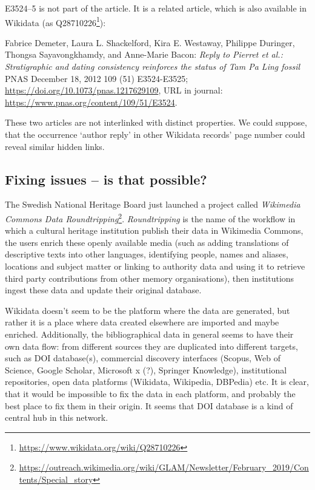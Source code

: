 E3524–5 is not part of the article. It is a related article, which is also available in Wikidata (as Q28710226\footnote{\url{https://www.wikidata.org/wiki/Q28710226}}):

Fabrice Demeter, Laura L. Shackelford, Kira E. Westaway, Philippe Duringer, Thongsa Sayavongkhamdy, and Anne-Marie Bacon: \emph{Reply to Pierret et al.: Stratigraphic and dating consistency reinforces the status of Tam Pa Ling fossil} PNAS December 18, 2012 109 (51) E3524-E3525; \url{https://doi.org/10.1073/pnas.1217629109}, URL in journal: \url{https://www.pnas.org/content/109/51/E3524}.

These two articles are not interlinked with distinct properties. We could suppose, that the occurrence `author reply' in other Wikidata records' page number could reveal similar hidden links.

\subsection{Fixing issues -- is that possible?}

The Swedish National Heritage Board just launched a project called \emph{Wikimedia Commons Data Roundtripping}\footnote{\url{https://outreach.wikimedia.org/wiki/GLAM/Newsletter/February_2019/Contents/Special_story}}. \emph{Roundtripping} is the name of the workflow in which a cultural heritage institution publish their data in Wikimedia Commons, the users enrich these openly available media (such as adding translations of descriptive texts into other languages, identifying people, names and aliases, locations and subject matter or linking to authority data and using it to retrieve third party contributions from other memory organisations), then institutions ingest these data and update their original database.

Wikidata doesn't seem to be the platform where the data are generated, but rather it is a place where data created elsewhere are imported and maybe enriched. Additionally, the bibliographical data in general seems to have their own data flow: from different sources they are duplicated into different targets, such as DOI database(s), commercial discovery interfaces (Scopus, Web of Science, Google Scholar, Microsoft x (?), Springer Knowledge), institutional repositories, open data platforms (Wikidata, Wikipedia, DBPedia) etc. It is clear, that it would be impossible to fix the data in each platform, and probably the best place to fix them in their origin. It seems that DOI database is a kind of central hub in this network.

